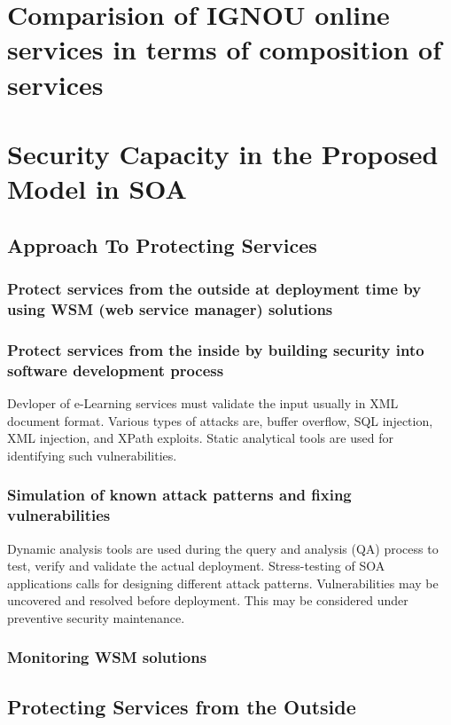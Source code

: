 \section{Comparision of IGNOU online services in terms of composition of services}
\blindtext
\section{Security Capacity in the Proposed Model in SOA}
\blindtext
\subsection{Approach To Protecting Services}
\blindtext

\subsubsection{Protect services from the outside at deployment time by using WSM (web service manager) solutions}
\blindtext
\subsubsection{Protect services from the inside by building security into software development process}
Devloper of e-Learning services must validate the input usually in XML document format. Various types of attacks are, buffer overflow, SQL injection, XML injection,
and XPath exploits. Static analytical tools are used for identifying such vulnerabilities.
\subsubsection{Simulation of known attack patterns and fixing vulnerabilities}
Dynamic analysis tools are used during the query and analysis (QA) process to
test, verify and validate the actual deployment. Stress-testing of SOA applications
calls for designing different attack patterns. Vulnerabilities may be uncovered and
resolved before deployment. This may be considered under preventive security
maintenance.
\subsubsection{Monitoring WSM solutions}
\blindtext
\subsection{Protecting Services from the Outside}
\blindtext

